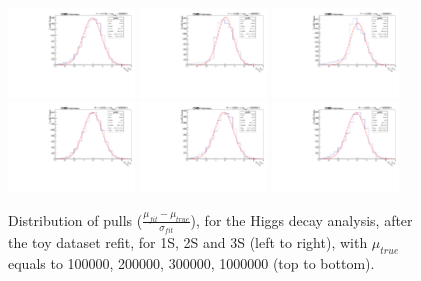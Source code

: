 \begin{figure}[!htbp]
\begin{center}
\includegraphics[width=0.3\textwidth]{figures/modeling_xchecks/plots/HToUpsilon1SPhoton_Cat0_signalStrenght_300000/pulls}
\includegraphics[width=0.3\textwidth]{figures/modeling_xchecks/plots/HToUpsilon2SPhoton_Cat0_signalStrenght_300000/pulls}
\includegraphics[width=0.3\textwidth]{figures/modeling_xchecks/plots/HToUpsilon3SPhoton_Cat0_signalStrenght_300000/pulls}
\includegraphics[width=0.3\textwidth]{figures/modeling_xchecks/plots/HToUpsilon1SPhoton_Cat0_signalStrenght_1000000/pulls}
\includegraphics[width=0.3\textwidth]{figures/modeling_xchecks/plots/HToUpsilon2SPhoton_Cat0_signalStrenght_1000000/pulls}
\includegraphics[width=0.3\textwidth]{figures/modeling_xchecks/plots/HToUpsilon3SPhoton_Cat0_signalStrenght_1000000/pulls}
\end{center}
\caption{Distribution of pulls ($\frac{\mu_{fit} - \mu_{true}}{\sigma_{fit}}$), for the Higgs decay analysis, after the toy dataset refit, for 1S, 2S and 3S (left to right), with $\mu_{true}$ equals to 100000, 200000, 300000, 1000000 (top to bottom).}
\label{fig:modeling_xchecks_H}
\end{figure}


